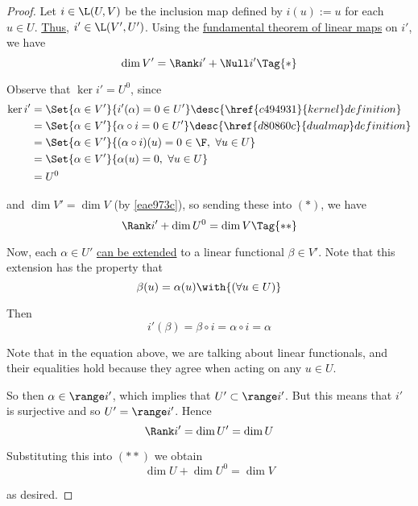 \begin{proof}
  Let $i\in\L(U,V)$ be the inclusion map defined by $i(u):=u$ for each $u\in
  U$. \href{d80860c}{Thus}, $i'\in\L(V',U')$. Using the
  \href{e83dffc}{fundamental theorem of linear maps} on $i'$, we have
  \begin{equation*}
    \dim V'=\Rank i'+\Null i'\Tag{*}
  \end{equation*}

  Observe that $\ker i'=U^0$, since
  \begin{align*}
    \ker i' &=\Set{\alpha\in V'}{i'(\alpha)=0\in U'}\desc{\href{c494931}{kernel} definition}      \\
            &=\Set{\alpha\in V'}{\alpha\circ i=0\in U'}\desc{\href{d80860c}{dual map} definition} \\
            &=\Set{\alpha\in V'}{(\alpha\circ i)(u)=0\in\F,\ \forall u\in U}                      \\
            &=\Set{\alpha\in V'}{\alpha(u)=0,\ \forall u\in U}                                    \\
            &=U^0
  \end{align*}

  and $\dim V'=\dim V$ (by \autoref{eae973c}), so sending these into $(*)$, we
  have
  \begin{equation*}
    \Rank i'+\dim U^0=\dim V\Tag{**}
  \end{equation*}

  Now, each $\alpha\in U'$ \href{ebbd7cd}{can be extended} to a linear
  functional $\beta\in V'$. Note that this extension has the property that
  $$
    \beta(u)=\alpha(u)\with{(\forall u\in U)}
  $$

  Then
  $$
    i'(\beta)=\beta\circ i=\alpha\circ i=\alpha
  $$

  Note that in the equation above, we are talking about linear functionals, and
  their equalities hold because they agree when acting on any $u\in U$.

  So then $\alpha\in\range i'$, which implies that $U'\subset\range i'$. But
  this means that $i'$ is surjective and so $U'=\range i'$. Hence
  $$
    \Rank i'=\dim U'=\dim U
  $$

  Substituting this into $(**)$ we obtain
  $$
    \dim U+\dim U^0=\dim V
  $$

  as desired.
\end{proof}

\label{c38f2c0}

